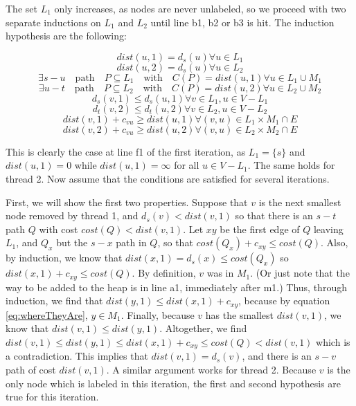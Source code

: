 \documentclass{article}
\begin{document}
The set $L_1$ only increases, as nodes are never unlabeled, so we proceed with two separate inductions on $L_1$ and $L_2$ until line b1, b2 or b3 is hit.
The induction hypothesis are the following:

$$dist(u,1) = d_s(u) \forall u \in L_1$$
\begin{equation}
dist(u,2) = d_s(u) \forall u \in L_2
\label{eq:equality}
\end{equation}
$$\exists s-u \quad \text{path} \quad P \subseteq L_1 \quad \text{with}\quad  C(P) = dist(u, 1) \forall u \in L_1 \cup M_1 $$
$$\exists u-t \quad \text{path} \quad P \subseteq L_2 \quad \text{with}\quad  C(P) = dist(u, 2) \forall u \in L_2 \cup M_2 $$
$$d_s(v,1) \le d_s(u,1) \forall v \in L_1, u \in V-L_1$$
\begin{equation}
d_t(v,2) \le d_t(u,2) \forall v \in L_2, u \in V-L_2
\label{eq:inOrder}
\end{equation}
$$dist(v,1) + c_{vu} \ge dist(u,1) \forall (v,u) \in L_1 \times M_1 \cap E$$
$$dist(v,2) + c_{vu} \ge dist(u,2) \forall (v,u) \in L_2 \times M_2 \cap E$$






This is clearly the case at line f1 of the first iteration, as $L_1 = \{s\}$ and $dist(u,1) = 0$ while $dist(u,1) = \infty$ for all $u \in V - L_1$.
The same holds for thread 2.
Now assume that the conditions are satisfied for several iterations.

First, we will show the first two properties.
Suppose that $v$ is the next smallest node removed by thread 1, and $d_s(v) < dist(v,1)$ so that there is an $s-t$ path $Q$ with cost $cost(Q) < dist(v,1)$.
Let $xy$ be the first edge of $Q$ leaving $L_1$, and $Q_x$ but the $s-x$ path in $Q$, so that $cost(Q_x) + c_{xy} \le cost(Q)$.
Also, by induction, we know that $dist(x, 1) = d_s(x) \le cost(Q_x)$ so $dist(x, 1) + c_{xy} \le cost(Q)$.
By definition, $v$ was in $M_1$. (Or just note that the way to be added to the heap is in line a1, immediately after m1.)
Thus, through induction, we find that $dist(y, 1) \le dist(x, 1) + c_{xy}$, because by equation \ref{eq:whereTheyAre}, $y \in M_1$.
Finally, because $v$ has the smallest $dist(v, 1)$, we know that $dist(v,1) \le dist(y, 1)$.
Altogether, we find $dist(v,1) \le dist(y,1) \le dist(x,1) + c_{xy} \le cost(Q) < dist(v,1)$ which is a contradiction.
This implies that $dist(v,1) = d_s(v)$, and there is an $s-v$ path of cost $dist(v,1)$.
A similar argument works for thread 2.
Because $v$ is the only node which is labeled in this iteration, the first and second hypothesis are true for this iteration.
\end{document}
